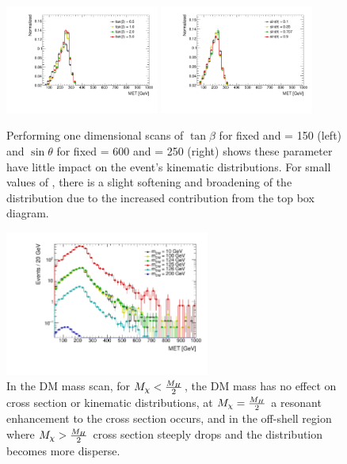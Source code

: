 \begin{figure}
\centering
\includegraphics[width=0.45\textwidth]{texinputs/04_grid/figures/monoz/leptonic/TanbScan_mH600ma150_MET.pdf} 
\includegraphics[width=0.45\textwidth]{texinputs/04_grid/figures/monoz/leptonic/SinpScan_mH600ma250_MET.pdf} 
\caption{Performing one dimensional scans of $\tan{\beta}$ for fixed  \GeV and \ma = 150 \GeV (left) and $\sin{\theta}$ for fixed \mA = 600 \GeV and \ma = 250 \GeV (right) shows these parameter have little impact on the event's kinematic distributions.  For small values of \tanb, there is a slight softening and broadening of the \MET distribution due to the increased contribution from the top box diagram.}
\label{fig:monoz_kin_tanb_sintheta}
\end{figure}


\begin{figure}
\centering
\includegraphics[width=0.6\textwidth]{texinputs/04_grid/figures/monoz/leptonic/dm_scan_met_ll.pdf}
\caption{In the DM mass scan, for $M_{\chi} < \frac{M_{H}}{2}$, the DM mass has no effect on cross section or kinematic distributions, at $M_{\chi} = \frac{M_{H}}{2}$ a resonant enhancement to the cross section occurs, and in the off-shell region where  $M_{\chi} > \frac{M_{H}}{2}$ cross section steeply drops and the \MET distribution becomes more disperse.}
\label{fig:dm_scan_ll}
\end{figure}


